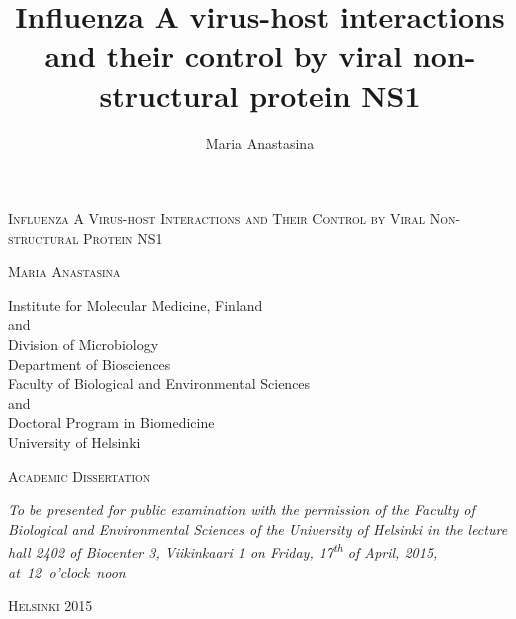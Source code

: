 \documentclass[a4paper,12pt]{article} %
\title{Influenza A virus-host interactions \\ and their control by viral non-structural protein NS1}
\author{Maria Anastasina}
\begin{document}
\begin{singlespace}



\begin{titlepage}
	\begin{center}
	
	
		\thispagestyle{empty}
		\vspace*{1.5 cm}	
	
		\LARGE \textsc{Influenza A Virus-host Interactions and Their Control by Viral Non-structural Protein NS1}
		
		\vspace{2 cm}
		
		\Large \textsc{Maria Anastasina}
		
		\vspace{2 cm}
		
		\large Institute for Molecular Medicine, Finland \\
		and\\
		Division of Microbiology \\
		Department of Biosciences \\
		Faculty of Biological and Environmental Sciences\\
		and\\
		Doctoral Program in Biomedicine\\
		University of Helsinki
		
		\vspace{2.5 cm}
		
		\large \textsc{Academic Dissertation}
		
		\vspace{1 cm}		
		
		\textit{To be presented for public examination with the permission of the Faculty of Biological and Environmental Sciences of the University of Helsinki in the lecture hall 2402 of Biocenter 3, Viikinkaari 1 on Friday, 17\textsuperscript{th} of April, 2015, at~12~o'clock~noon}
		
		\vspace{1.5 cm}
		\large \textsc{Helsinki 2015}
	\end{center}
\end{titlepage}

\newpage
\thispagestyle{empty}


\end{singlespace}
\end{document}
